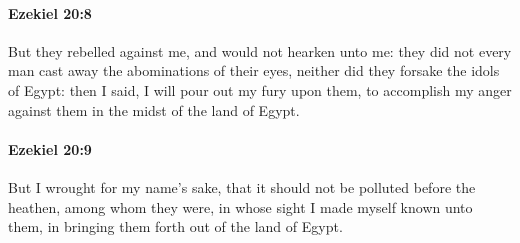 		\paragraph{Ezekiel 20:8} %
			\label{EZEKIEL-20-8}

			But they rebelled against me, and would not hearken unto me: they did not every man cast away the abominations of their eyes, neither did they forsake the idols of Egypt: then I said, I will pour out my fury upon them, to accomplish my anger against them in the midst of the land of Egypt.


		\paragraph{Ezekiel 20:9} %
			\label{EZEKIEL-20-9}

			But I wrought for my name’s sake, that it should not be polluted before the heathen, among whom they were, in whose sight I made myself known unto them, in bringing them forth out of the land of Egypt.

